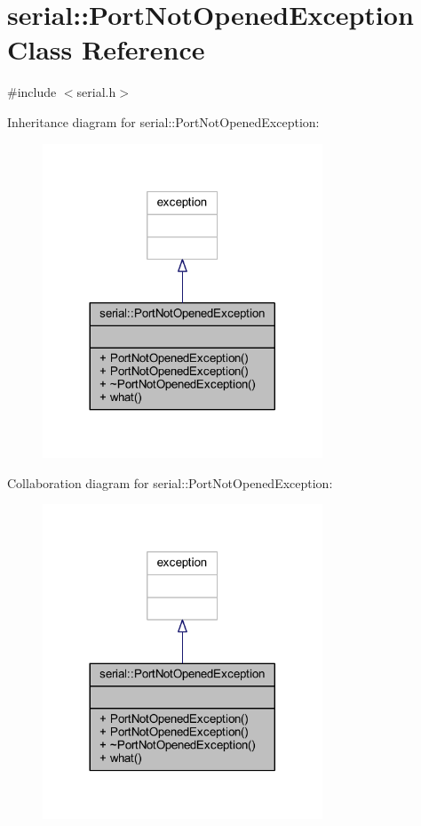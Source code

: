 \hypertarget{classserial_1_1_port_not_opened_exception}{}\section{serial\+:\+:Port\+Not\+Opened\+Exception Class Reference}
\label{classserial_1_1_port_not_opened_exception}


{\ttfamily \#include $<$serial.\+h$>$}



Inheritance diagram for serial\+:\+:Port\+Not\+Opened\+Exception\+:\nopagebreak
\begin{figure}[H]
\begin{center}
\leavevmode
\includegraphics[width=236pt]{classserial_1_1_port_not_opened_exception__inherit__graph}
\end{center}
\end{figure}


Collaboration diagram for serial\+:\+:Port\+Not\+Opened\+Exception\+:\nopagebreak
\begin{figure}[H]
\begin{center}
\leavevmode
\includegraphics[width=236pt]{classserial_1_1_port_not_opened_exception__coll__graph}
\end{center}
\end{figure}
